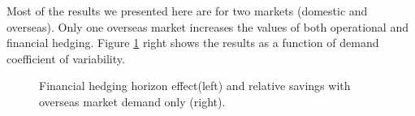 \documentclass[mnsc,nonblindrev,copyedit]{informs2_wz} %
\begin{document}
  Most of the results we presented here are for two markets (domestic and overseas).  Only one overseas market increases the values of both operational and financial hedging.  Figure \ref{fig:HorizonAndStructure} right shows the results as a function of demand coefficient of variability.
\begin{figure}[ht]
\begin{center}
\begin{minipage}{6in}
    \begin{minipage}{3.1in}
        \epsfxsize=2.8in
    \hspace{-0.0in}    
    \end{minipage}
    \begin{minipage}{2.8in}
        \epsfxsize=2.8in
    \hspace{-0.0in}    
    \end{minipage}
\end{minipage}
\vspace{.05in} \caption{Financial hedging horizon effect(left) and relative savings with overseas market demand only (right).} \label{fig:HorizonAndStructure} \vspace{-.2in}
\end{center}
\end{figure}
\end{document}

